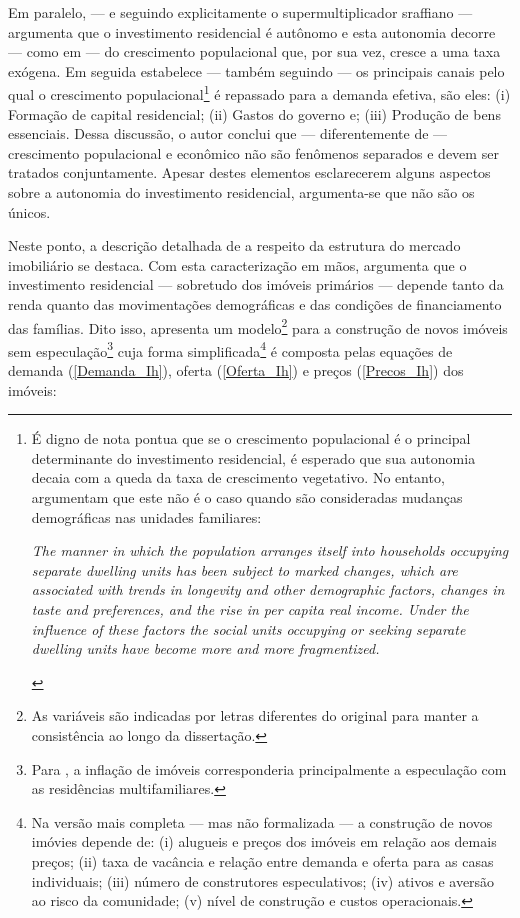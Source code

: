 Em paralelo, --- e seguindo explicitamente o supermultiplicador sraffiano --- \textcite{gowans_introducing_2014} argumenta que o investimento residencial é autônomo e esta autonomia decorre --- como em \textcite{hansen_economic_1939} --- do crescimento populacional que, por sua vez, cresce a uma taxa exógena.
Em seguida estabelece --- também seguindo \textcite{hansen_economic_1939} --- os principais canais pelo qual o crescimento populacional\footnote{
É digno de nota pontua que se o crescimento populacional é o principal determinante do investimento residencial, é esperado que sua autonomia decaia com a queda da taxa de crescimento vegetativo.
No entanto,  \textcite[p.~11]{grebler_capital_1956} argumentam que este não é o caso quando são consideradas mudanças demográficas nas unidades familiares:

\begin{citacao}
	\textit{The manner in which the population arranges itself into households
		occupying separate dwelling units has been subject to marked changes,
		which are associated with trends in longevity and other demographic
		factors, changes in taste and preferences, and the rise in per capita real
		income. Under the influence of these factors the social units occupying
		or seeking separate dwelling units have become more and more fragmentized.}
\end{citacao}
} é repassado para a demanda efetiva, são eles: (i) Formação de capital residencial; (ii) Gastos do governo e; (iii) Produção de bens essenciais.
Dessa discussão, o autor conclui que --- diferentemente de \textcite{robinson_model_1962} --- crescimento populacional e econômico não são fenômenos separados e devem ser tratados conjuntamente.
Apesar destes elementos esclarecerem alguns aspectos sobre a autonomia do investimento residencial, argumenta-se que não são os únicos.

Neste ponto, a descrição detalhada de \textcite{duesenberry_investment_1958} a respeito da estrutura do mercado imobiliário se destaca.
Com esta caracterização em mãos, argumenta que o investimento residencial --- sobretudo dos imóveis primários --- depende tanto da renda quanto das movimentações demográficas e das condições de financiamento das famílias.
Dito isso, \textcite{duesenberry_investment_1958} apresenta um modelo\footnote{As variáveis são indicadas por letras diferentes do original para manter a consistência ao longo da dissertação.} para a construção de novos imóveis sem especulação\footnote{Para \textcite{duesenberry_investment_1958}, a inflação de imóveis corresponderia principalmente a especulação com as residências multifamiliares.} cuja forma simplificada\footnote{
	Na versão mais completa --- mas não formalizada --- a construção de novos imóvies depende de: (i) alugueis e preços dos imóveis em relação aos demais preços; (ii) taxa de vacância e relação entre demanda e oferta para as casas individuais; (iii) número de construtores especulativos; (iv) ativos e aversão ao risco da comunidade; (v) nível de construção e custos operacionais.} é composta pelas equações de demanda (\ref{Demanda_Ih}), oferta (\ref{Oferta_Ih}) e preços (\ref{Precos_Ih}) dos imóveis:

